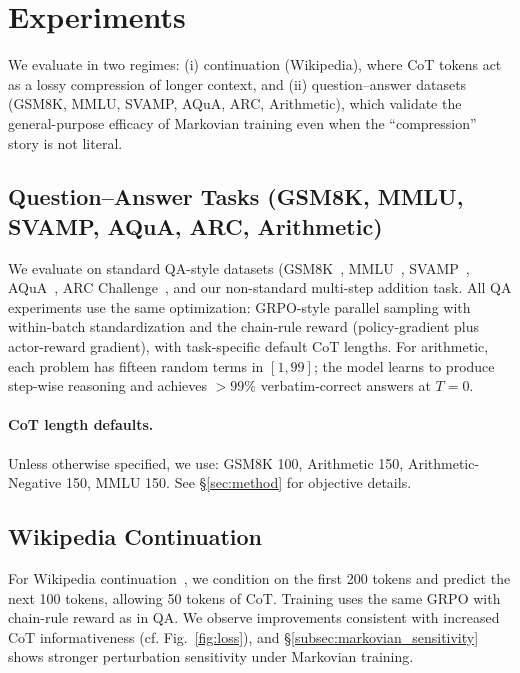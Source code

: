 \documentclass{article} %
\begin{document}


\section{Experiments}
\label{sec:experiments}


\noindent We evaluate in two regimes: (i) continuation (Wikipedia), where CoT tokens act as a lossy compression of longer context, and (ii) question–answer datasets (GSM8K, MMLU, SVAMP, AQuA, ARC, Arithmetic), which validate the general-purpose efficacy of Markovian training even when the ``compression'' story is not literal.
\subsection{Question–Answer Tasks (GSM8K, MMLU, SVAMP, AQuA, ARC, Arithmetic)}
\label{subsec:qa}
We evaluate on standard QA-style datasets (GSM8K~\citep{cobbe2021gsm8k}, MMLU~\citep{hendrycks2020mmlu}, SVAMP~\citep{patel2021svamp}, AQuA~\citep{ling2017aqua}, ARC Challenge~\citep{clark2018arc}, and our non-standard multi-step addition task. All QA experiments use the same optimization: GRPO-style parallel sampling with within-batch standardization and the chain-rule reward (policy-gradient plus actor-reward gradient), with task-specific default CoT lengths. For arithmetic, each problem has fifteen random terms in $[1,99]$; the model learns to produce step-wise reasoning and achieves $>99\%$ verbatim-correct answers at $T{=}0$.

\paragraph{CoT length defaults.} Unless otherwise specified, we use: GSM8K 100, Arithmetic 150, Arithmetic-Negative 150, MMLU 150. See \S\ref{sec:method} for objective details.

\subsection{Wikipedia Continuation}
\label{subsec:wikipedia}
For Wikipedia continuation~\citep{wikipediadump}, we condition on the first 200 tokens and predict the next 100 tokens, allowing 50 tokens of CoT. Training uses the same GRPO with chain-rule reward as in QA. We observe improvements consistent with increased CoT informativeness (cf. Fig.~\ref{fig:loss}), and \S\ref{subsec:markovian_sensitivity} shows stronger perturbation sensitivity under Markovian training.
\end{document}
